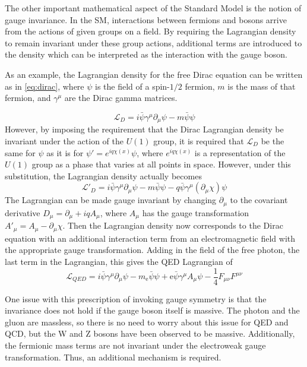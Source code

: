The other important mathematical aspect of the Standard Model is the notion of gauge invariance. In the SM, interactions between fermions and bosons arrive from the actions of given groups on a field. By requiring the Lagrangian density to remain invariant under these group actions, additional terms are introduced to the density which can be interpreted as the interaction with the gauge boson.

As an example, the Lagrangian density for the free Dirac equation can be written as in \cref{eq:dirac}, where $\psi$ is the field of a spin-$1/2$ fermion, $m$ is the mass of that fermion, and $\gamma^\mu$ are the Dirac gamma matrices.

\begin{equation}
    \mathcal{L}_D = i\bar{\psi}\gamma^\mu\partial_\mu\psi-m\bar{\psi}\psi
    \label{eq:dirac}
\end{equation}
However, by imposing the requirement that the Dirac Lagrangian density be invariant under the action of the $U(1)$ group, it is required that $\mathcal{L}_D$ be the same for $\psi$ as it is for $\psi' = e^{iq\chi(x)}\psi$, where $e^{iq\chi(x)}$ is a representation of the $U(1)$ group as a phase that varies at all points in space. However, under this substitution, the Lagrangian density actually becomes
\begin{equation}
    \mathcal{L}'_D = i\bar{\psi}\gamma^\mu\partial_\mu\psi-m\bar{\psi}\psi-q\bar{\psi}\gamma^\mu(\partial_\mu\chi)\psi
\end{equation}
The Lagrangian can be made gauge invariant by changing $\partial_\mu$ to the covariant derivative $D_\mu = \partial_\mu + iqA_\mu$, where $A_\mu$ has the gauge transformation $A'_\mu =  A_\mu-\partial_\mu\chi$. Then the Lagrangian density now corresponds to the Dirac equation with an additional interaction term from an electromagnetic field with the appropriate gauge transformation. Adding in the field of the free photon, the last term in the Lagrangian, this gives the QED Lagrangian of
\begin{equation}
    \mathcal{L}_{QED} = i\bar{\psi}\gamma^\mu\partial_\mu\psi-m_\mathrm{e}\bar{\psi}\psi+\mathrm{e}\bar{\psi}\gamma^\mu A_\mu\psi-\frac{1}{4}F_{\mu\nu}F^{\mu\nu}
\end{equation}

One issue with this prescription of invoking gauge symmetry is that the invariance does not hold if the gauge boson itself is massive. The photon and the gluon are massless, so there is no need to worry about this issue for QED and QCD, but the W and Z bosons have been observed to be massive. Additionally, the fermionic mass terms are not invariant under the electroweak gauge transformation. Thus, an additional mechanism is required.


